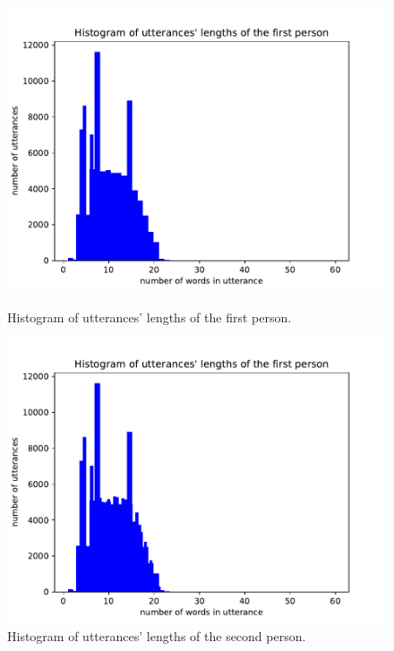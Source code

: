 \begin{figure}[htb]
  \includegraphics[width=\linewidth]{figures/uttr1_length.pdf}
  \caption{Histogram of utterances' lengths of the first person.}\label{fig:histogram_uttr1_length}
\endminipage\hfill
{}
  \includegraphics[width=\linewidth]{figures/uttr2_length.pdf}
  \caption{Histogram of utterances' lengths of the second person.}\label{fig:histogram_uttr2_length}
\endminipage
\end{figure}



